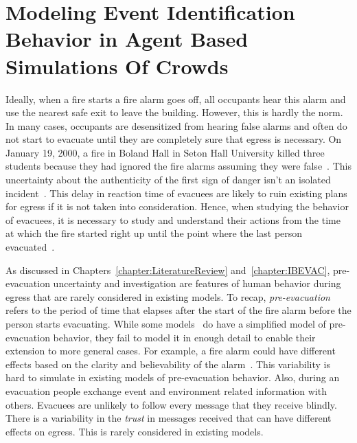 
\chapter{Modeling Event Identification Behavior in Agent Based Simulations Of Crowds}
\label{chapter:PreEvacuationBehavior}


Ideally, when a fire starts a fire alarm goes off, all occupants hear this alarm and use the nearest safe exit to leave the building. However, this is hardly the norm. In many cases, occupants are desensitized from hearing false alarms and often do not start to evacuate until they are completely sure that egress is necessary. On January 19, 2000, a fire in Boland Hall in Seton Hall University killed three students because they had ignored the fire alarms assuming they were false~\cite{Berry:2000us}. This uncertainty about the authenticity of the first sign of danger isn't an isolated incident~\cite{Graham:2000vl,Proulx:2001we,Proulx:1995wq,Proulx:2003tc,Purser:2001ts,Ramachandran:1990wj,Sime:1995uu,Tong:1985wn}. This delay in reaction time of evacuees are likely to ruin existing plans for egress if it is not taken into consideration. Hence, when studying the behavior of evacuees, it is necessary to study and understand their actions from the time at which the fire started right up until the point where the last person evacuated~\cite{Tong:1985wn}.



As discussed in Chapters~\ref{chapter:LiteratureReview} and~\ref{chapter:IBEVAC}, pre-evacuation uncertainty and investigation are features of human behavior during egress that are rarely considered in existing models. To recap, \emph{pre-evacuation} refers to the period of time that elapses after the start of the fire alarm before the person starts evacuating. While some models~\cite{Tsai:2011tz} do have a simplified model of pre-evacuation behavior, they fail to model it in enough detail to enable their extension to more general cases. For example, a fire alarm could have different effects based on the clarity and believability of the alarm~\cite{Kobes:2009jx,Paulsen:1984ti}. This variability is hard to simulate in existing models of pre-evacuation behavior. Also, during an evacuation people exchange event and environment related information with others. Evacuees are unlikely to follow every message that they receive blindly. There is a variability in the \emph{trust} in messages received that can have different effects on egress. This is rarely considered in existing models.


